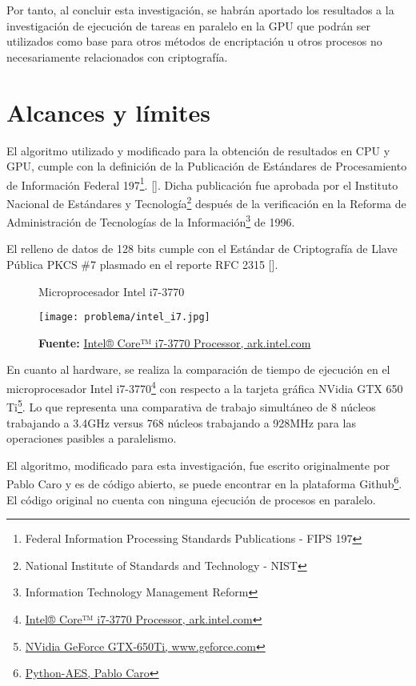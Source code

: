 \documentclass[../main/main.tex]{subfiles}
\begin{document}
  Por tanto, al concluir esta investigación, se habrán aportado los resultados a la investigación de ejecución de tareas en paralelo en la GPU que podrán ser utilizados como base para otros métodos de encriptación u otros procesos no necesariamente relacionados con criptografía.

  \section{Alcances y límites} \label{limites_alcances}

  El algoritmo utilizado y modificado para la obtención de resultados en CPU y GPU, cumple con la definición de la Publicación de Estándares de Procesamiento de Información Federal 197\footnote{Federal Information Processing Standards Publications - FIPS 197}. [\cite{report:FIPS_197}]. Dicha publicación fue aprobada por el Instituto Nacional de Estándares y Tecnología\footnote{National Institute of Standards and Technology - NIST} después de la verificación en la Reforma de Administración de Tecnologías de la Información\footnote{Information Technology Management Reform} de 1996.

  El relleno de datos de 128 bits cumple con el Estándar de Criptografía de Llave Pública PKCS \#7 plasmado en el reporte RFC 2315 [\cite{report:RFC_2315}].

  \begin{figure}[H]
    \centering
    \caption{Microprocesador Intel i7-3770}
    \texttt{[image: problema/intel\_i7.jpg]}
    \caption*{\textbf{Fuente:} \href{https://tinyurl.com/yb3tqpvu}{Intel® Core™ i7-3770 Processor, ark.intel.com}}
  \end{figure}

  En cuanto al hardware, se realiza la comparación de tiempo de ejecución en el microprocesador Intel i7-3770\footnote{\href{https://tinyurl.com/yb3tqpvu}{Intel® Core™ i7-3770 Processor, ark.intel.com}} con respecto a la tarjeta gráfica NVidia GTX 650 Ti\footnote{\href{https://tinyurl.com/ycr3kouv}{NVidia GeForce GTX-650Ti, www.geforce.com}}. Lo que representa una comparativa de trabajo simultáneo de 8 núcleos trabajando a 3.4GHz versus 768 núcleos trabajando a 928MHz para las operaciones pasibles a paralelismo.

  El algoritmo, modificado para esta investigación, fue escrito originalmente por Pablo Caro y es de código abierto, se puede encontrar en la plataforma Github\footnote{\href{https://github.com/pcaro90/Python-AES}{Python-AES, Pablo Caro}}. El código original no cuenta con ninguna ejecución de procesos en paralelo.
\end{document}

